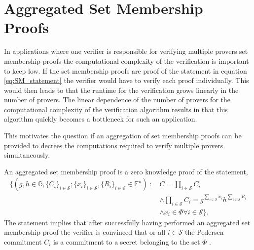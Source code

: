 \chapter{Aggregated Set Membership Proofs}
\label{ch:generalAgg}

In applications where one verifier is responsible for verifying multiple provers set membership proofs the computational complexity of the verification is important to keep low. If the set membership proofs are proof of the statement in equation \eqref{eq:SM_statement} the verifier would have to verify each proof individually. This would then leads to that the runtime for the verification grows linearly in the number of provers. The linear dependence of the number of provers for the computational complexity of the verification algorithm results in that this algorithm quickly becomes a bottleneck for such an application. 

This motivates the question if an aggregation of set membership proofs can be provided to decrees the computations required to verify multiple provers simultaneously. 

An aggregated set membership proof is a zero knowledge proof of the statement,
\begin{equation}
\begin{aligned} 
\label{eq:SMagg_statement}
    \big\{(g,h\in\mathds{G},\{C_i\}_{i\in\mathcal{S}};\{x_i\}_{i\in\mathcal{S}},\{R_i\}_{i\in\mathcal{S}}\in\mathds{F}^n)\:: 
\: &C=\prod_{i\in\mathcal{S}}C_i 
\\
 &\wedge \prod_{i\in\mathcal{S}}C_i  =   g^{\sum_{i\in\mathcal{S}}x_i} h^{\sum_{i\in\mathcal{S}}R_i} 
 \\
 &\wedge x_i \in \Phi \forall i\in\mathcal{S} \big\}.
\end{aligned}
\end{equation}
The statement implies that after successfully having performed an aggregated set membership proof the verifier is convinced that or all $i\in\mathcal{S}$  the  Pedersen commitment $C_i$ is a commitment to a secret belonging to the set $\Phi$ . 




